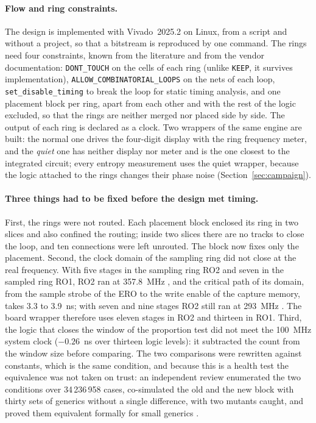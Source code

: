 \paragraph{Flow and ring constraints.} The design is implemented with
Vivado~2025.2 on Linux, from a script and without a project, so that a
bitstream is reproduced by one command. The rings need four constraints,
known from the literature and from the vendor documentation:
\texttt{DONT\_TOUCH} on the cells of each ring (unlike \texttt{KEEP}, it
survives implementation), \texttt{ALLOW\_COMBINATORIAL\_LOOPS} on the nets
of each loop, \texttt{set\_disable\_timing} to break the loop for static
timing analysis, and one placement block per ring, apart from each other
and with the rest of the logic excluded, so that the rings are neither
merged nor placed side by side. The output of each ring is declared as a
clock. Two wrappers of the same engine are built: the normal one drives
the four-digit display with the ring frequency meter, and the
\emph{quiet} one has neither display nor meter and is the one closest to
the integrated circuit; every entropy measurement uses the quiet wrapper,
because the logic attached to the rings changes their phase noise
(Section~\ref{sec:campaign}).

\paragraph{Three things had to be fixed before the design met timing.}
First, the rings were not routed. Each placement block enclosed its ring
in two slices and also confined the routing; inside two slices there are
no tracks to close the loop, and ten connections were left unrouted. The
block now fixes only the placement. Second, the clock domain of the
sampling ring did not close at the real frequency. With five stages in
the sampling ring RO2 and seven in the sampled ring RO1, RO2 ran at
357.8~MHz \meas{}, and the critical path of its domain, from the sample
strobe of the \ac{ERO} to the write enable of the capture memory, takes
3.3 to 3.9~ns; with seven and nine stages RO2 still ran at 293~MHz
\meas{}. The board wrapper therefore uses eleven stages in RO2 and
thirteen in RO1. Third, the logic that closes the window of the
proportion test did not meet the 100~MHz system clock ($-0.26$~ns over
thirteen logic levels): it subtracted the count from the window size
before comparing. The two comparisons were rewritten against constants,
which is the same condition, and because this is a health test the
equivalence was not taken on trust: an independent review enumerated the
two conditions over 34\,236\,958 cases, co-simulated the old and the new
block with thirty sets of generics without a single difference, with two
mutants caught, and proved them equivalent formally for small generics
\simu{}.

